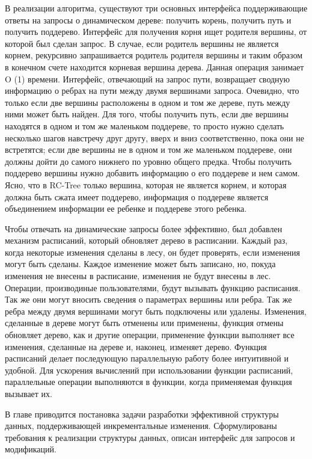 \documentclass[specification,annotation]{itmo-student-thesis}
\begin{document}
В реализации алгоритма, существуют три основных интерфейса поддерживающие ответы на запросы о динамическом дереве: получить корень, получить путь и получить поддерево. Интерфейс для получения корня ищет родителя вершины, от которой был сделан запрос. В случае, если родитель вершины не является корнем, рекурсивно запрашивается родитель родителя вершины и таким образом в конечном счете находится корневая вершина дерева. Данная операция занимает O (1) времени. Интерфейс, отвечающий на запрос пути, возвращает сводную информацию о ребрах на пути между двумя вершинами запроса. Очевидно, что только если две вершины расположены в одном и том же дереве, путь между ними может быть найден. Для того, чтобы получить путь, если две вершины находятся в одном и том же маленьком поддереве, то просто нужно сделать несколько шагов навстречу друг другу, вверх и вниз соответственно, пока 
они не встретятся; если две вершины не в одном и том же маленьком поддереве, они должны дойти до самого нижнего по уровню общего предка. Чтобы получить поддерево вершины нужно добавить информацию о его 
поддереве и нем самом. Ясно, что в RC-Tree только вершина, которая не является корнем, и которая должна быть сжата имеет поддерево, информация о поддереве является объединением информации ее ребенке 
и поддереве этого ребенка.



Чтобы отвечать на динамические запросы более эффективно, был добавлен механизм расписаний, который обновляет дерево в расписании. Каждый раз, когда некоторые изменения сделаны в лесу, он будет проверять, если изменения могут быть сделаны. Каждое изменение может быть записано, но, покуда изменения не внесены в расписание, изменения не будут внесены в лес. 
Операции, производиные пользователями, будут вызывать функцию расписания. Так же они могут вносить сведения о параметрах вершины или ребра. Так же ребра между двумя вершинами могут быть подключены или удалены. Изменения, сделанные 
в дереве могут быть отменены или применены, функция отмены обновляет дерево, как и другие операции, применение функции выполняет все изменения, сделанные на дереве и, наконец, изменяет дерево. Функция расписаний делает последующую параллельную работу более интуитивной и удобной. 
Для ускорения вычислений при использовании функции расписаний, параллельные операции выполняются в функции, когда 
применяемая функция вызывает их.

\chapterconclusion

В главе приводится постановка задачи разработки эффективной структуры данных, поддерживающей инкрементальные изменения. 
Сформулированы требования к реализации структуры данных, описан интерфейс для запросов и модификаций. 
\end{document}
